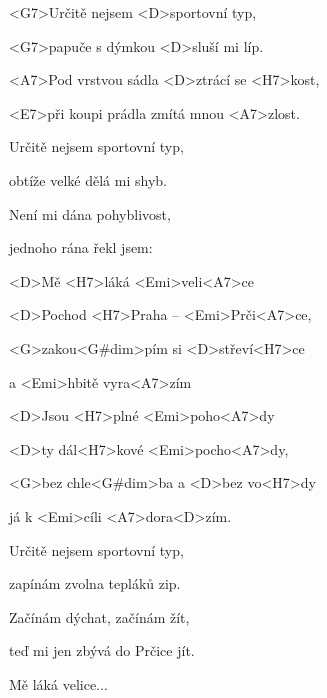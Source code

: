 

\zs
<G7>Určitě nejsem <D>sportovní typ,

<G7>papuče s dýmkou <D>sluší mi líp.

<A7>Pod vrstvou sádla <D>ztrácí se <H7>kost,

<E7>při koupi prádla zmítá mnou <A7>zlost.
\ks

\zs
Určitě nejsem sportovní typ,

obtíže velké dělá mi shyb.

Není mi dána pohyblivost,

jednoho rána řekl jsem: 
\ks

\zr
<D>Mě <H7>láká <Emi>veli<A7>ce

<D>Pochod <H7>Praha – <Emi>Prči<A7>ce,

<G>zakou<G#dim>pím si <D>střeví<H7>ce

a <Emi>hbitě vyra<A7>zím

<D>Jsou <H7>plné <Emi>poho<A7>dy

<D>ty dál<H7>kové <Emi>pocho<A7>dy,

<G>bez chle<G#dim>ba a <D>bez vo<H7>dy

já k <Emi>cíli <A7>dora<D>zím.
\kr

\zs
Určitě nejsem sportovní typ,

zapínám zvolna tepláků zip.

Začínám dýchat, začínám žít,

teď mi jen zbývá do Prčice jít.
\ks

\zr
Mě láká velice...
\kr

\kp
